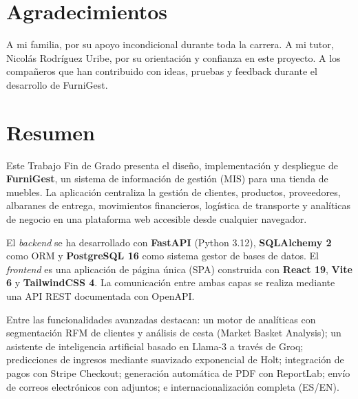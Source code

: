 \documentclass[12pt,twoside,titlepage]{report}
\newcommand\blankpage{%
    \newpage
    \null
    \thispagestyle{empty}%
    \newpage}
\begin{document}
\hypersetup{pageanchor=true}
\normalsize
\afterpage{\blankpage}

\setlength{\parskip}{0.75em}
\renewcommand{\baselinestretch}{1.25}

\setcounter{page}{2}

\chapter*{Agradecimientos}

A mi familia, por su apoyo incondicional durante toda la carrera. A mi tutor, Nicolás Rodríguez Uribe, por su orientación y confianza en este proyecto. A los compañeros que han contribuido con ideas, pruebas y feedback durante el desarrollo de FurniGest.

\afterpage{\blankpage}

\chapter*{Resumen}

Este Trabajo Fin de Grado presenta el diseño, implementación y despliegue de \textbf{FurniGest}, un sistema de información de gestión (MIS) para una tienda de muebles. La aplicación centraliza la gestión de clientes, productos, proveedores, albaranes de entrega, movimientos financieros, logística de transporte y analíticas de negocio en una plataforma web accesible desde cualquier navegador.

El \emph{backend} se ha desarrollado con \textbf{FastAPI} (Python 3.12), \textbf{SQLAlchemy 2} como ORM y \textbf{PostgreSQL 16} como sistema gestor de bases de datos. El \emph{frontend} es una aplicación de página única (SPA) construida con \textbf{React 19}, \textbf{Vite 6} y \textbf{TailwindCSS 4}. La comunicación entre ambas capas se realiza mediante una API REST documentada con OpenAPI.

Entre las funcionalidades avanzadas destacan: un motor de analíticas con segmentación RFM de clientes y análisis de cesta (Market Basket Analysis); un asistente de inteligencia artificial basado en Llama-3 a través de Groq; predicciones de ingresos mediante suavizado exponencial de Holt; integración de pagos con Stripe Checkout; generación automática de PDF con ReportLab; envío de correos electrónicos con adjuntos; e internacionalización completa (ES/EN).
\end{document}
